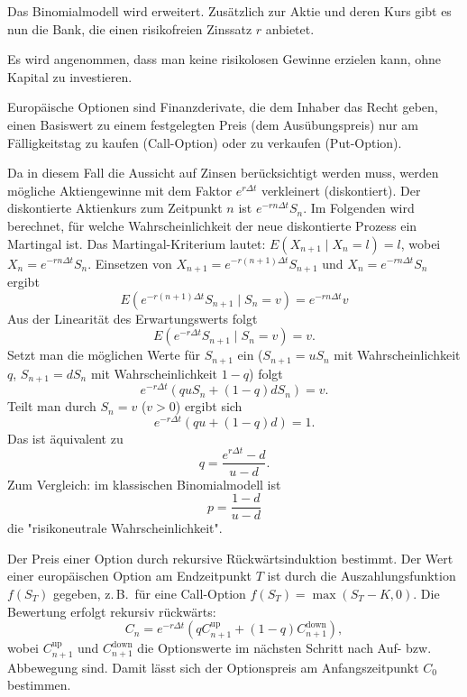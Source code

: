 Das Binomialmodell wird erweitert. Zusätzlich zur Aktie und deren Kurs gibt es nun die Bank, die einen risikofreien Zinssatz $r$ anbietet.

\begin{defi}
Es wird angenommen, dass man keine risikolosen Gewinne erzielen kann, ohne Kapital zu investieren.
\end{defi}

\begin{defi}
    Europäische Optionen sind Finanzderivate, die dem Inhaber das Recht geben, 
    einen Basiswert zu einem festgelegten Preis (dem Ausübungspreis) nur am 
    Fälligkeitstag zu kaufen (Call-Option) oder zu verkaufen (Put-Option).
\end{defi}


\begin{lemma}
Da in diesem Fall die Aussicht auf Zinsen berücksichtigt werden muss,
werden mögliche Aktiengewinne mit dem Faktor $e^{r \Delta t}$ verkleinert (diskontiert).
Der diskontierte Aktienkurs zum Zeitpunkt $n$ ist $e^{-r n \Delta t} S_n$.
Im Folgenden wird berechnet, für welche Wahrscheinlichkeit der neue diskontierte Prozess
ein Martingal ist. Das Martingal-Kriterium lautet: $E(X_{n+1} \mid X_n = l) = l$, wobei $X_n = e^{-r n \Delta t} S_n$.
Einsetzen von $X_{n+1} = e^{-r (n+1) \Delta t} S_{n+1}$ und $X_n = e^{-r n \Delta t} S_n$ ergibt
$$
E(e^{-r (n+1) \Delta t} S_{n+1} \mid S_n = v) = e^{-r n \Delta t} v
$$
Aus der Linearität des Erwartungswerts folgt
$$
E(e^{-r \Delta t} S_{n+1} \mid S_n=v) = v.
$$
Setzt man die möglichen Werte für $S_{n+1}$ ein ($S_{n+1} = u S_n$ mit Wahrscheinlichkeit $q$, $S_{n+1} = d S_n$ mit Wahrscheinlichkeit $1-q$) folgt
$$
e^{-r \Delta t} \left( q u S_n + (1-q) d S_n \right) = v.
$$
Teilt man durch $S_n = v$ ($v > 0$) ergibt sich
$$
e^{-r \Delta t} \left( q u + (1-q) d \right) = 1.
$$
Das ist äquivalent zu
$$
q = \frac{e^{r \Delta t} - d}{u - d}.
$$
Zum Vergleich: im klassischen Binomialmodell ist 
$$p = \frac{1 - d}{u - d}$$
die "risikoneutrale Wahrscheinlichkeit".
\end{lemma}

\begin{satz}
Der Preis einer Option durch rekursive Rückwärtsinduktion bestimmt. 
Der Wert einer europäischen Option am Endzeitpunkt $T$ ist durch die Auszahlungsfunktion $f(S_T)$ gegeben, z.\,B.\ für eine Call-Option $f(S_T) = \max(S_T - K, 0)$.
Die Bewertung erfolgt rekursiv rückwärts:
$$
C_n = e^{-r \Delta t} \left( q C_{n+1}^\text{up} + (1-q) C_{n+1}^\text{down} \right),
$$
wobei $C_{n+1}^\text{up}$ und $C_{n+1}^\text{down}$ die Optionswerte im nächsten Schritt nach Auf- bzw. Abbewegung sind.
Damit lässt sich der Optionspreis am Anfangszeitpunkt $C_0$ bestimmen.
\end{satz}

